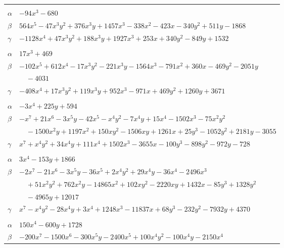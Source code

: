 \documentclass[11pt]{article}
\begin{document}
\begin{longtable}{@{}ll@{}}
\addlinespace[3pt]
\multicolumn{2}{@{}l}{$\{i,j\}=\{64,70\}$, $k_{ij}=2^{3}\cdot 3^{2}\cdot 5\cdot 17$}\\
$\alpha$ & $-94x^{3}-680$\\
$\beta$ & $564x^{5}-47x^{3}y^{2}+376x^{3}y+1457x^{3}-338x^{2}-423x-340y^{2}+511y-1868$\\
$\gamma$ & $-1128x^{4}+47x^{3}y^{2}+188x^{3}y+1927x^{3}+253x+340y^{2}-849y+1532$\\
\addlinespace[3pt]
\multicolumn{2}{@{}l}{$\{i,j\}=\{64,93\}$, $k_{ij}=2^{2}\cdot 3^{5}\cdot 5$}\\
$\alpha$ & $17x^{3}+469$\\
$\beta$ & $-102x^{5}+612x^{4}-17x^{3}y^{2}-221x^{3}y-1564x^{3}-791x^{2}+360x-469y^{2}-2051y$\\
 & $\quad -4031$\\
$\gamma$ & $-408x^{4}+17x^{3}y^{2}+119x^{3}y+952x^{3}-971x+469y^{2}+1260y+3671$\\
\addlinespace[3pt]
\multicolumn{2}{@{}l}{$\{i,j\}=\{64,101\}$, $k_{ij}=2^{5}\cdot 3\cdot 5\cdot 17$}\\
$\alpha$ & $-3x^{4}+225y+594$\\
$\beta$ & $-x^{7}+21x^{6}-3x^{5}y-42x^{5}-x^{4}y^{2}-7x^{4}y+15x^{4}-1502x^{3}-75x^{2}y^{2}$\\
 & $\quad -1500x^{2}y+1197x^{2}+150xy^{2}-1506xy+1261x+25y^{3}-1052y^{2}+2181y-3055$\\
$\gamma$ & $x^{7}+x^{4}y^{2}+34x^{4}y+111x^{4}+1502x^{3}-3655x-100y^{3}-898y^{2}-972y-728$\\
\addlinespace[3pt]
\multicolumn{2}{@{}l}{$\{i,j\}=\{65,72\}$, $k_{ij}=2^{3}\cdot 3\cdot 5\cdot 11\cdot 13$}\\
$\alpha$ & $3x^{4}-153y+1866$\\
$\beta$ & $-2x^{7}-21x^{6}-3x^{5}y-36x^{5}+2x^{4}y^{2}+29x^{4}y-36x^{4}-2496x^{3}$\\
 & $\quad +51x^{2}y^{2}+762x^{2}y-14865x^{2}+102xy^{2}-2220xy+1432x-85y^{3}+1328y^{2}$\\
 & $\quad -4965y+12017$\\
$\gamma$ & $x^{7}-x^{4}y^{2}-28x^{4}y+3x^{4}+1248x^{3}-11837x+68y^{3}-232y^{2}-7932y+4370$\\
\addlinespace[3pt]
\multicolumn{2}{@{}l}{$\{i,j\}=\{65,81\}$, $k_{ij}=2^{4}\cdot 3\cdot 11^{2}$}\\
$\alpha$ & $150x^{4}-600y+1728$\\
$\beta$ & $-200x^{7}-1500x^{6}-300x^{5}y-2400x^{5}+100x^{4}y^{2}-100x^{4}y-2150x^{4}$\\

\end{longtable}
\end{document}
